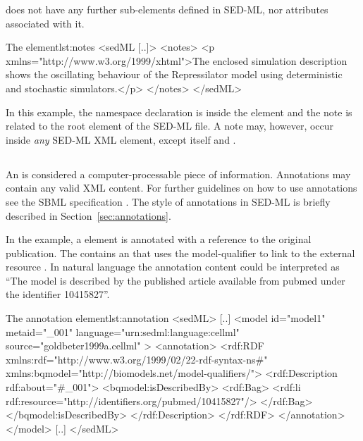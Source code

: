  does not have any further sub-elements defined in SED-ML, nor attributes associated with it.


\begin{myXmlLst}{The  element}{lst:notes}
<sedML [..]>
	<notes>
  		<p xmlns="http://www.w3.org/1999/xhtml">The enclosed simulation description shows the oscillating behaviour of the Repressilator model using deterministic and stochastic simulators.</p>
	</notes>
</sedML>
\end{myXmlLst}

In this example, the namespace declaration is inside the  element and the note is related to the  root element of the SED-ML file. A note may, however, occur inside \emph{any} SED-ML XML element, except  itself and \hyperref[class:annotation]{}.


\subsection{}
\label{class:annotation}

An  is considered a computer-processable piece of information. Annotations may contain any valid XML content. For further guidelines on how to use annotations see the SBML specification \citep{HBH+10}. The style of annotations in SED-ML is briefly described in Section~\ref{sec:annotations}.

 In the example, a \hyperref[class:model]{} element is annotated with a reference to the original publication. The  contains an  that uses the model-qualifier  to link to the external resource . In natural language the annotation content could be interpreted as ``The model is described by the published article available from pubmed under the identifier 10415827''.

\begin{myXmlLst}{The annotation element}{lst:annotation}
<sedML>
	[..]
	<model id="model1" metaid="_001" language="urn:sedml:language:cellml" source="goldbeter1999a.cellml" >
		<annotation>
    		<rdf:RDF xmlns:rdf="http://www.w3.org/1999/02/22-rdf-syntax-ns#" xmlns:bqmodel="http://biomodels.net/model-qualifiers/">
				<rdf:Description rdf:about="#_001">
				<bqmodel:isDescribedBy>
				<rdf:Bag>
					<rdf:li rdf:resource="http://identifiers.org/pubmed/10415827"/>
				</rdf:Bag>
				</bqmodel:isDescribedBy>
    			</rdf:Description>
			</rdf:RDF>
		</annotation>
	</model>
	[..]
</sedML>
\end{myXmlLst}


